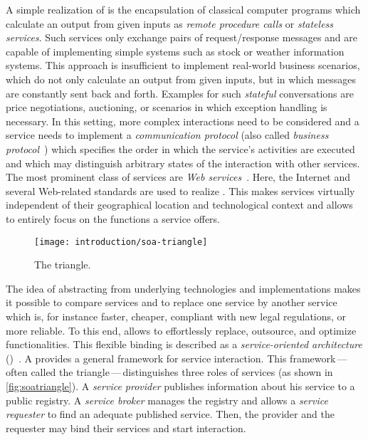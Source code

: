 A simple realization of  is the encapsulation of classical computer programs which calculate an output from given inputs as \emph{remote procedure calls} or \emph{stateless services}. Such services only exchange pairs of request/response messages and are capable of implementing simple systems such as stock or weather information systems. This approach is insufficient to implement real-world business scenarios, which do not only calculate an output from given inputs, but in which messages are constantly sent back and forth. Examples for such \emph{stateful} conversations are price negotiations, auctioning, or scenarios in which exception handling is necessary. In this setting, more complex interactions need to be considered and a service needs to implement a \emph{communication protocol} (also called \emph{business protocol}~\cite{Papazoglou_2007_book}) which specifies the order in which the service's activities are executed and which may distinguish arbitrary states of the interaction with other services. The most prominent class of services are \emph{Web services}~\cite{AlonsoCKM_2003}. Here, the Internet and several Web-related standards are used to realize . This makes services virtually independent of their geographical location and technological context and allows to entirely focus on the functions a service offers.

\begin{figure}
\centering
\texttt{[image: introduction/soa-triangle]}
\caption{The  triangle.}
\label{fig:soatriangle}
\end{figure}

The idea of abstracting from underlying technologies and implementations makes it possible to compare services and to replace one service by another service which is, for instance faster, cheaper, compliant with new legal regulations, or more reliable. To this end,  allows to effortlessly replace, outsource, and optimize functionalities. This flexible binding is described as a \emph{service-oriented architecture} ()~\cite{Gottschalk00}. A  provides a general framework for service interaction. This framework\,---\,often called the  triangle\,---\,distinguishes three roles of services (as shown in \autoref{fig:soatriangle}). A \emph{service provider} publishes information about his service to a public registry. A \emph{service broker} manages the registry and allows a \emph{service requester} to find an adequate published service. Then, the provider and the requester may bind their services and start interaction.

